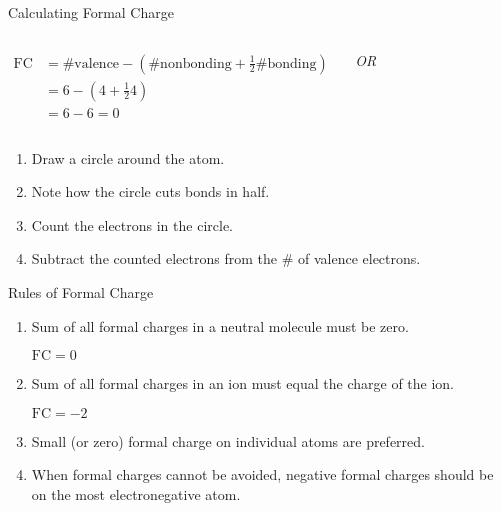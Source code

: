 \documentclass[notes=onlyslideswithnotes,notes=hide]{beamer}
\begin{document}
\begin{frame}{Calculating Formal Charge}
	\begin{columns}
		\centering
		\centering
		\begin{align*}
			\text{FC} &= \text{\# valence} - \left(\text{\# nonbonding}
			+ \frac{1}{2}\text{\# bonding}\right) \\
			&= 6 - \left(4 + \frac{1}{2}4\right) \\
			&= 6 - 6 = 0
		\end{align*}

		\pause

		\textit{OR}

		\bigskip
	\end{columns}

	\begin{enumerate}
		\item Draw a circle around the atom.
		\item Note how the circle cuts bonds in half.
		\item Count the electrons in the circle.
		\item Subtract the counted electrons from the \# of
			valence electrons.
	\end{enumerate}
\end{frame}

\begin{frame}{Rules of Formal Charge}
	\begin{enumerate}
		\item Sum of all formal charges in a neutral molecule must be
			zero.

			\begin{center}
				 \qquad $\text{FC} = 0$
			\end{center}

		\item Sum of all formal charges in an ion must equal the charge
			of the ion.

			\begin{center}
				 \qquad $\text{FC} = -2$
			\end{center}

		\item Small (or zero) formal charge on individual atoms are
			preferred.

		\item When formal charges cannot be avoided, negative formal
			charges should be on the most electronegative atom.
	\end{enumerate}
\end{frame}
\end{document}
